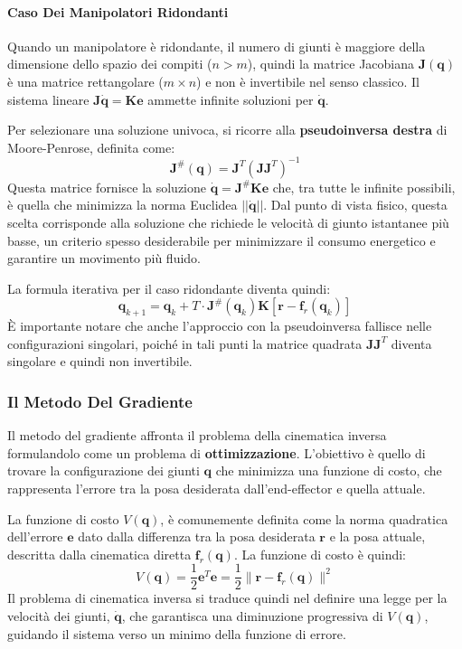 \documentclass[11pt, a4paper]{report}
\begin{document}
\paragraph{Caso Dei Manipolatori Ridondanti}
Quando un manipolatore è ridondante, il numero di giunti è maggiore della dimensione dello spazio dei compiti (\(n > m\)), quindi la matrice Jacobiana \(\bm{J}(\bm{q})\) è una matrice rettangolare (\(m \times n\)) e non è invertibile nel senso classico. Il sistema lineare \(\bm{J}\dot{\bm{q}} = \bm{K}\bm{e}\) ammette infinite soluzioni per \(\dot{\bm{q}}\).

Per selezionare una soluzione univoca, si ricorre alla \textbf{pseudoinversa destra} di Moore-Penrose, definita come:
\[
    \bm{J}^{\#}(\bm{q}) = \bm{J}^T (\bm{J} \bm{J}^T)^{-1}
\]
Questa matrice fornisce la soluzione \(\dot{\bm{q}} = \bm{J}^{\#} \bm{K} \bm{e}\) che, tra tutte le infinite possibili, è quella che minimizza la norma Euclidea \(||\dot{\bm{q}}||\). Dal punto di vista fisico, questa scelta corrisponde alla soluzione che richiede le velocità di giunto istantanee più basse, un criterio spesso desiderabile per minimizzare il consumo energetico e garantire un movimento più fluido.

La formula iterativa per il caso ridondante diventa quindi:
\[
    \bm{q}_{k+1} = \bm{q}_k + T \cdot \bm{J}^{\#}(\bm{q}_k) \bm{K} \left[ \bm{r} - \bm{f}_r(\bm{q}_k) \right]
\]
È importante notare che anche l'approccio con la pseudoinversa fallisce nelle configurazioni singolari, poiché in tali punti la matrice quadrata \(\bm{J}\bm{J}^T\) diventa singolare e quindi non invertibile.

\newpage
\subsubsection{Il Metodo Del Gradiente}
Il metodo del gradiente affronta il problema della cinematica inversa formulandolo come un problema di \textbf{ottimizzazione}. L'obiettivo è quello di trovare la configurazione dei giunti \(\bm{q}\) che minimizza una funzione di costo, che rappresenta l'errore tra la posa desiderata dall'end-effector e quella attuale.

La funzione di costo \(V(\bm{q})\), è comunemente definita come la norma quadratica dell'errore \(\bm{e}\) dato dalla differenza tra la posa desiderata \(\bm{r}\) e la posa attuale, descritta dalla cinematica diretta \(\bm{f}_r(\bm{q})\). La funzione di costo è quindi:
\[
    V(\bm{q}) = \frac{1}{2} \bm{e}^T \bm{e} = \frac{1}{2} \| \bm{r} - \bm{f}_r(\bm{q}) \|^2
\]
Il problema di cinematica inversa si traduce quindi nel definire una legge per la velocità dei giunti, \(\dot{\bm{q}}\), che garantisca una diminuzione progressiva di \(V(\bm{q})\), guidando il sistema verso un minimo della funzione di errore.
\end{document}
